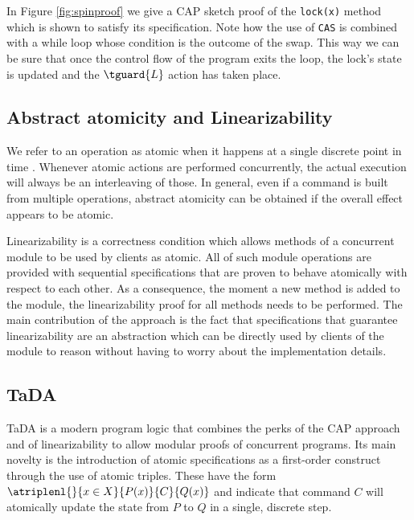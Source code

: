 In Figure \ref{fig:spinproof} we give a CAP sketch proof of the \texttt{lock(x)} method which is shown to satisfy its specification. Note how the use of \texttt{CAS} is combined with a while loop whose condition is the outcome of the swap. This way we can be sure that once the control flow of the program exits the loop, the lock's state is updated and the $\tguard{L}$ action has taken place.

\tocless\subsection{Abstract atomicity and Linearizability}

We refer to an operation as atomic when it happens at a single discrete point in time \cite{modularsteps}. Whenever atomic actions are performed concurrently, the actual execution will always be an interleaving of those. In general, even if a command is built from multiple operations, abstract atomicity can be obtained if the overall effect appears to be atomic.

Linearizability \cite{linearizability} is a correctness condition which allows methods of a concurrent module to be used by clients as atomic. All of such module operations are provided with sequential specifications that are proven to behave atomically with respect to each other. As a consequence, the moment a new method is added to the module, the linearizability proof for all methods needs to be performed. The main contribution of the approach is the fact that specifications that guarantee linearizability are an abstraction which can be directly used by clients of the module to reason without having to worry about the implementation details. \\

\tocless\subsection{TaDA} \label{s:tada}

TaDA \cite{tada} is a modern program logic that combines the perks of the CAP approach and of linearizability to allow modular proofs of concurrent programs. Its main novelty is the introduction of atomic specifications as a first-order construct through the use of atomic triples. These have the form $\atriplenl{}{x \in X}{P(x)}{C}{Q(x)}$ and indicate that command $C$ will atomically update the state from $P$ to $Q$ in a single, discrete step. \\


